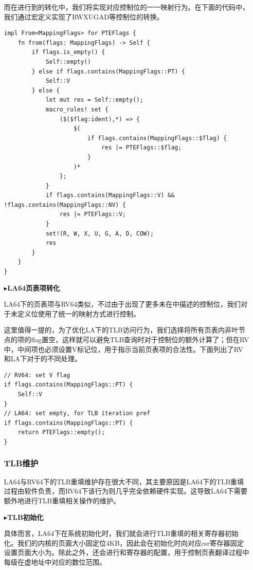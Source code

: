 \documentclass{article}
\begin{document}
而在进行到的转化中，我们将实现对应控制位的一一映射行为。在下面的代码中，我们通过宏定义实现了RWXUGAD等控制位的转换。

\begin{lstlisting}
impl From<MappingFlags> for PTEFlags {
    fn from(flags: MappingFlags) -> Self {
        if flags.is_empty() {
            Self::empty()
        } else if flags.contains(MappingFlags::PT) {
            Self::V
        } else {
            let mut res = Self::empty();
            macro_rules! set {
                ($($flag:ident),*) => {
                    $(
                        if flags.contains(MappingFlags::$flag) {
                            res |= PTEFlags::$flag;
                        }
                    )*
                };
            }
            if flags.contains(MappingFlags::V) && !flags.contains(MappingFlags::NV) {
                res |= PTEFlags::V;
            }
            set!(R, W, X, U, G, A, D, COW);
            res
        }
    }
}
\end{lstlisting}

$\blacktriangleright$\textbf{LA64页表项转化}

LA64下的页表项与RV64类似，不过由于出现了更多未在中描述的控制位，我们对于未定义位使用了统一的映射方式进行控制。

这里值得一提的，为了优化LA下的TLB访问行为，我们选择将所有页表内非叶节点的项的flag置空，这样就可以避免TLB查询时对于控制位的额外计算了；但在RV中，中间项也必须设置V标记位，用于指示当前页表项的合法性。下面列出了RV和LA下对于的不同处理。

\begin{lstlisting}
// RV64: set V flag
if flags.contains(MappingFlags::PT) {
    Self::V
}
// LA64: set empty, for TLB iteration pref
if flags.contains(MappingFlags::PT) {
    return PTEFlags::empty();
}
\end{lstlisting}

\subsubsection{TLB维护}

LA64与RV64下的TLB重填维护存在很大不同，其主要原因是LA64下的TLB重填过程由软件负责，而RV64下该行为则几乎完全依赖硬件实现。这导致LA64下需要额外地进行TLB重填相关操作的维护。

$\blacktriangleright$\textbf{TLB初始化}

具体而言，LA64下在系统初始化时，我们就会进行TLB重填的相关寄存器初始化。我们的内核的页面大小固定位4KB，因此会在初始化时向对应csr寄存器固定设置页面大小为。除此之外，还会进行和寄存器的配置，用于控制页表翻译过程中每级在虚地址中对应的数位范围。
\end{document}
